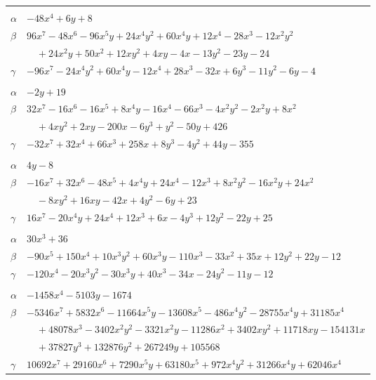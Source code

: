 \documentclass[11pt]{article}
\begin{document}
\begin{longtable}{@{}ll@{}}
\addlinespace[3pt]
\multicolumn{2}{@{}l}{$\{i,j\}=\{58,63\}$, $k_{ij}=2^{2}\cdot 3$}\\
$\alpha$ & $-48x^{4}+6y+8$\\
$\beta$ & $96x^{7}-48x^{6}-96x^{5}y+24x^{4}y^{2}+60x^{4}y+12x^{4}-28x^{3}-12x^{2}y^{2}$\\
 & $\quad +24x^{2}y+50x^{2}+12xy^{2}+4xy-4x-13y^{2}-23y-24$\\
$\gamma$ & $-96x^{7}-24x^{4}y^{2}+60x^{4}y-12x^{4}+28x^{3}-32x+6y^{3}-11y^{2}-6y-4$\\
\addlinespace[3pt]
\multicolumn{2}{@{}l}{$\{i,j\}=\{58,73\}$, $k_{ij}=3^{6}$}\\
$\alpha$ & $-2y+19$\\
$\beta$ & $32x^{7}-16x^{6}-16x^{5}+8x^{4}y-16x^{4}-66x^{3}-4x^{2}y^{2}-2x^{2}y+8x^{2}$\\
 & $\quad +4xy^{2}+2xy-200x-6y^{3}+y^{2}-50y+426$\\
$\gamma$ & $-32x^{7}+32x^{4}+66x^{3}+258x+8y^{3}-4y^{2}+44y-355$\\
\addlinespace[3pt]
\multicolumn{2}{@{}l}{$\{i,j\}=\{58,80\}$, $k_{ij}=2\cdot 3\cdot 7$}\\
$\alpha$ & $4y-8$\\
$\beta$ & $-16x^{7}+32x^{6}-48x^{5}+4x^{4}y+24x^{4}-12x^{3}+8x^{2}y^{2}-16x^{2}y+24x^{2}$\\
 & $\quad -8xy^{2}+16xy-42x+4y^{2}-6y+23$\\
$\gamma$ & $16x^{7}-20x^{4}y+24x^{4}+12x^{3}+6x-4y^{3}+12y^{2}-22y+25$\\
\addlinespace[3pt]
\multicolumn{2}{@{}l}{$\{i,j\}=\{58,86\}$, $k_{ij}=2^{2}\cdot 3^{2}$}\\
$\alpha$ & $30x^{3}+36$\\
$\beta$ & $-90x^{5}+150x^{4}+10x^{3}y^{2}+60x^{3}y-110x^{3}-33x^{2}+35x+12y^{2}+22y-12$\\
$\gamma$ & $-120x^{4}-20x^{3}y^{2}-30x^{3}y+40x^{3}-34x-24y^{2}-11y-12$\\
\addlinespace[3pt]
\multicolumn{2}{@{}l}{$\{i,j\}=\{58,100\}$, $k_{ij}=2^{4}\cdot 7$}\\
$\alpha$ & $-1458x^{4}-5103y-1674$\\
$\beta$ & $-5346x^{7}+5832x^{6}-11664x^{5}y-13608x^{5}-486x^{4}y^{2}-28755x^{4}y+31185x^{4}$\\
 & $\quad +48078x^{3}-3402x^{2}y^{2}-3321x^{2}y-11286x^{2}+3402xy^{2}+11718xy-154131x$\\
 & $\quad +37827y^{3}+132876y^{2}+267249y+105568$\\
$\gamma$ & $10692x^{7}+29160x^{6}+7290x^{5}y+63180x^{5}+972x^{4}y^{2}+31266x^{4}y+62046x^{4}$\\

\end{longtable}
\end{document}
